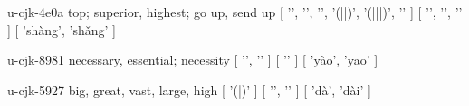 \begin{multicols}{2}
\cjkgGlue{} u-cjk-4e0a  top; superior, highest; go up, send up  [ '\cjkgGlue{}', '\cjkgGlue{}', '\cjkgGlue{}', '\cjkgGlue{}(\cjkgGlue{}|\cjkgGlue{}|\cjkgGlue{})', '\cjkgGlue{}(\cjkgGlue{}|\cjkgGlue{}|\cjkgGlue{}|\cjkgGlue{})', '\cjkgGlue{}' ]  [ '\cjkgGlue{}', '\cjkgGlue{}', '\cjkgGlue{}' ]  [ 'shàng', 'sh{\mktsRsgFb{}ǎ}ng' ] 

\cjkgGlue{} u-cjk-8981  necessary, essential; necessity  [ '\cjkgGlue{}', '\cjkgGlue{}' ]  [ '\cjkgGlue{}' ]  [ 'yào', 'y{\mktsRsgFb{}ā}o' ] 

\cjkgGlue{} u-cjk-5927  big, great, vast, large, high  [ '\cjkgGlue{}(\cjkgGlue{}|\cjkgGlue{})' ]  [ '\cjkgGlue{}', '\cjkgGlue{}' ]  [ 'dà', 'dài' ] 


\end{multicols}
